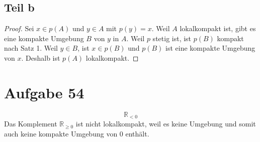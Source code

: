 \documentclass[10pt,a4paper]{article}
\begin{document}
\subsection{Teil b}

\begin{proof}
  Sei $x \in p(A)$ und $y \in A$ mit $p(y) = x$.
  Weil $A$ lokalkompakt ist, gibt es eine kompakte Umgebung $B$ von $y$ in $A$.
  Weil $p$ stetig ist, ist $p(B)$ kompakt nach Satz 1.
  Weil $y \in B$, ist $x \in p(B)$ und $p(B)$ ist eine kompakte Umgebung von $x$.
  Deshalb ist $p(A)$ lokalkompakt.
\end{proof}

\section{Aufgabe 54}

\begin{equation}
  \mathbb{R}_{< 0}
\end{equation}
Das Komplement $\mathbb{R}_{\ge 0}$ ist nicht lokalkompakt, weil es keine Umgebung und somit auch keine kompakte Umgebung von $0$ enthält.
\end{document}
